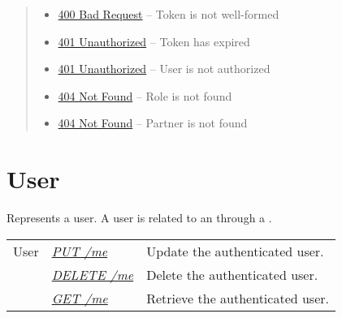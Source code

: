 \documentclass[letterpaper,10pt,english]{sphinxmanual}
\begin{document}
\begin{fulllineitems}
\begin{quote}
\begin{description}
\begin{itemize}
\item {} 
\href{http://www.w3.org/Protocols/rfc2616/rfc2616-sec10.html\#sec10.4.1}{400 Bad Request} -- Token is not well-formed

\item {} 
\href{http://www.w3.org/Protocols/rfc2616/rfc2616-sec10.html\#sec10.4.2}{401 Unauthorized} -- Token has expired

\item {} 
\href{http://www.w3.org/Protocols/rfc2616/rfc2616-sec10.html\#sec10.4.2}{401 Unauthorized} -- User is not authorized

\item {} 
\href{http://www.w3.org/Protocols/rfc2616/rfc2616-sec10.html\#sec10.4.5}{404 Not Found} -- Role is not found

\item {} 
\href{http://www.w3.org/Protocols/rfc2616/rfc2616-sec10.html\#sec10.4.5}{404 Not Found} -- Partner is not found

\end{itemize}

\end{description}\end{quote}

\end{fulllineitems}



\section{User}
\label{\detokenize{resources/user::doc}}\label{\detokenize{resources/user:user}}\label{\detokenize{resources/user:id1}}
Represents a user. A user is related to an {\hyperref[\detokenize{resources/organization:organization}]{}} through a {\hyperref[\detokenize{resources/partner:partner}]{}}.

\noindent\begin{tabulary}{\linewidth}{|L|L|L|}
\hline
{}\relax &\relax &\relax \\
\hline
User
&
{\hyperref[\detokenize{resources/user:put--me}]{\emph{PUT /me}}}
&
Update the authenticated user.
\\
\hline&
{\hyperref[\detokenize{resources/user:delete--me}]{\emph{DELETE /me}}}
&
Delete the authenticated user.
\\
\hline&
{\hyperref[\detokenize{resources/user:get--me}]{\emph{GET /me}}}
&
Retrieve the authenticated user.
\\
\hline\end{tabulary}
\end{document}
